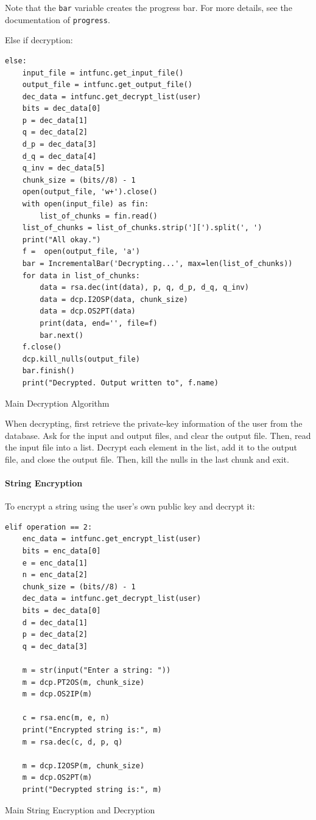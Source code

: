 \documentclass[twoside]{article}
\newenvironment{longlisting}{\captionsetup{type=listing}}{}
\begin{document}
Note that the \texttt{bar} variable creates the progress bar. For more details, see the
documentation of \texttt{progress}.

Else if decryption:

\begin{longlisting}
\begin{verbatim}
else:
    input_file = intfunc.get_input_file()
    output_file = intfunc.get_output_file()
    dec_data = intfunc.get_decrypt_list(user)
    bits = dec_data[0]
    p = dec_data[1]
    q = dec_data[2]
    d_p = dec_data[3]
    d_q = dec_data[4]
    q_inv = dec_data[5]
    chunk_size = (bits//8) - 1
    open(output_file, 'w+').close()
    with open(input_file) as fin:
        list_of_chunks = fin.read()
    list_of_chunks = list_of_chunks.strip('][').split(', ')
    print("All okay.")
    f =  open(output_file, 'a')
    bar = IncrementalBar('Decrypting...', max=len(list_of_chunks))
    for data in list_of_chunks:
        data = rsa.dec(int(data), p, q, d_p, d_q, q_inv)
        data = dcp.I2OSP(data, chunk_size)
        data = dcp.OS2PT(data)
        print(data, end='', file=f)
        bar.next()
    f.close()
    dcp.kill_nulls(output_file)
    bar.finish()
    print("Decrypted. Output written to", f.name)
\end{verbatim}
\caption{Main Decryption Algorithm}
\end{longlisting}
When decrypting, first retrieve the private-key information of the user from the database. Ask for
the input and output files, and clear the output file. Then, read the input file into a list.
Decrypt each element in the list, add it to the output file, and close the output file. Then, kill
the nulls in the last chunk and exit.


\paragraph{String Encryption}
To encrypt a string using the user's own public key and decrypt it:
\begin{longlisting}
\begin{verbatim}
elif operation == 2:
    enc_data = intfunc.get_encrypt_list(user)
    bits = enc_data[0]
    e = enc_data[1]
    n = enc_data[2]
    chunk_size = (bits//8) - 1
    dec_data = intfunc.get_decrypt_list(user)
    bits = dec_data[0]
    d = dec_data[1]
    p = dec_data[2]
    q = dec_data[3]

    m = str(input("Enter a string: "))
    m = dcp.PT2OS(m, chunk_size)
    m = dcp.OS2IP(m)

    c = rsa.enc(m, e, n)
    print("Encrypted string is:", m)
    m = rsa.dec(c, d, p, q)

    m = dcp.I2OSP(m, chunk_size)
    m = dcp.OS2PT(m)
    print("Decrypted string is:", m)
\end{verbatim}
\caption{Main String Encryption and Decryption}
\end{longlisting}
\end{document}
